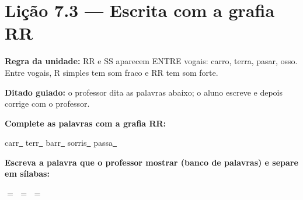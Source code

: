 \section{Lição 7.3 --- Escrita com a grafia RR}

\noindent\textbf{Regra da unidade:} RR e SS aparecem ENTRE vogais: carro, terra, pasar, osso. Entre vogais, R simples tem som fraco e RR tem som forte.


\noindent\textbf{Ditado guiado:} o professor dita as palavras abaixo; o aluno escreve e depois corrige com o professor.

\begin{center}
  \underline{\hspace{2.3cm}} \quad \underline{\hspace{2.3cm}} \quad \underline{\hspace{2.3cm}} \quad \underline{\hspace{2.3cm}}

  \underline{\hspace{2.3cm}} \quad \underline{\hspace{2.3cm}} \quad \underline{\hspace{2.3cm}} \quad \underline{\hspace{2.3cm}}
\end{center}

\noindent\textbf{Complete as palavras com a grafia RR:}
\begin{center}
  carr\underline{~} \quad terr\underline{~} \quad barr\underline{~} \quad sorris\underline{~} \quad passa\underline{~}
\end{center}

\noindent\textbf{Escreva a palavra que o professor mostrar (banco de palavras) e separe em sílabas:}

\begin{center}
  \underline{\hspace{2cm}} $=$ \underline{\hspace{2cm}} \quad \underline{\hspace{2cm}} $=$ \underline{\hspace{2cm}} \quad \underline{\hspace{2cm}} $=$ \underline{\hspace{2cm}}
  \end{center}



